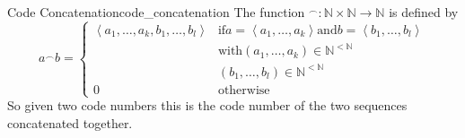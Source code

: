 \begin{definition}
{Code Concatenation}{code_concatenation}
The function \(^\frown: \mathbb{N} \times \mathbb{N} \rightarrow \mathbb{N}\) is
defined by
\[
a^{\frown} b = \left\{
\begin{array}
{cc}
\left\langle a_{1}, \ldots, a_{k}, b_{1}, \ldots, b_{l}\right\rangle & \text
{if} a = \left\langle a_{1}, \ldots, a_{k}\right\rangle \text {and} b =
\left\langle b_{1}, \ldots, b_{l}\right\rangle \\
& \text {with}\left(a_{1}, \ldots, a_{k}\right) \in \mathbb{N} ^{<\mathbb{N}} \\
& \left(b_{1}, \ldots, b_{l}\right) \in \mathbb{N} ^{<\mathbb{N}} \\
0 & \text {otherwise}
\end{array}
\right.
\]
So given two code numbers this is the code number of the two sequences
concatenated together.
\end{definition}
